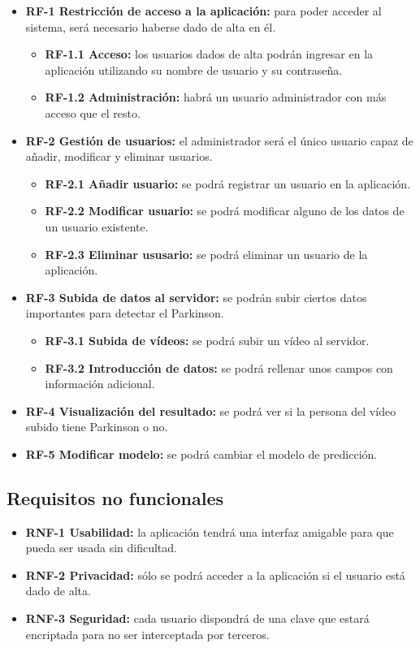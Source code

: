 \begin{itemize}
	\item \textbf{RF-1 Restricción de acceso a la aplicación:} para poder acceder al sistema, será necesario haberse dado de alta en él.
	\begin{itemize}
		\item \textbf{RF-1.1 Acceso:} los usuarios dados de alta podrán ingresar en la aplicación utilizando su nombre de usuario y su contraseña.
		\item \textbf{RF-1.2 Administración:} habrá un usuario administrador con más acceso que el resto.
	\end{itemize}
	\item \textbf{RF-2 Gestión de usuarios:} el administrador será el único usuario capaz de añadir, modificar y eliminar usuarios.
	\begin{itemize}
		\item \textbf{RF-2.1 Añadir usuario:} se podrá registrar un usuario en la aplicación.
		\item \textbf{RF-2.2 Modificar usuario:} se podrá modificar alguno de los datos de un usuario existente.
		\item \textbf{RF-2.3 Eliminar ususario:} se podrá eliminar un usuario de la aplicación.
	\end{itemize}
	\item \textbf{RF-3 Subida de datos al servidor:} se podrán subir ciertos datos importantes para detectar el Parkinson.
	\begin{itemize}
		\item \textbf{RF-3.1 Subida de vídeos:} se podrá subir un vídeo al servidor.
		\item \textbf{RF-3.2 Introducción de datos:} se podrá rellenar unos campos con información adicional.
	\end{itemize}
	\item \textbf{RF-4 Visualización del resultado:} se podrá ver si la persona del vídeo subido tiene Parkinson o no.
	\item \textbf{RF-5 Modificar modelo:} se podrá cambiar el modelo de predicción. 
\end{itemize}

\subsection{Requisitos no funcionales}
\begin{itemize}
	\item \textbf{RNF-1 Usabilidad:} la aplicación tendrá una interfaz amigable para que pueda ser usada sin dificultad.
	\item \textbf{RNF-2 Privacidad:} sólo se podrá acceder a la aplicación si el usuario está dado de alta.
	\item \textbf{RNF-3 Seguridad:} cada usuario dispondrá de una clave que estará encriptada para no ser interceptada por terceros.
	
	
\end{itemize}

